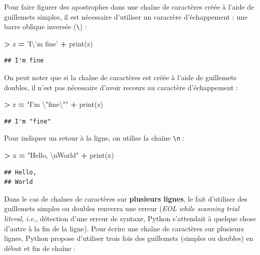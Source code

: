 \documentclass[12pt,]{book}
\newenvironment{Shaded}{\begin{snugshade}}{\end{snugshade}}
\newcommand{\CharTok}[1]{\textcolor[rgb]{0.31,0.60,0.02}{#1}}
\newcommand{\StringTok}[1]{\textcolor[rgb]{0.31,0.60,0.02}{#1}}
\newcommand{\OperatorTok}[1]{\textcolor[rgb]{0.81,0.36,0.00}{\textbf{#1}}}
\newcommand{\BuiltInTok}[1]{#1}
\newcommand{\NormalTok}[1]{#1}
\numberwithin{equation}{section}
\numberwithin{countremarque}{section}
\begin{document}
Pour faire figurer des apostrophes dans une chaîne de caractères créée à
l'aide de guillemets simples, il est nécessaire d'utiliser un caracrère
d'échappement : une barre oblique inversée (\texttt{\textbackslash{}}) :

\begin{Shaded}
\begin{Highlighting}[]
\OperatorTok{>}\NormalTok{ z }\OperatorTok{=} \StringTok{'I}\CharTok{\textbackslash{}'}\StringTok{m fine'}
\OperatorTok{+} \BuiltInTok{print}\NormalTok{(z)}
\end{Highlighting}
\end{Shaded}

\begin{lstlisting}
## I'm fine
\end{lstlisting}

On peut noter que si la chaîne de caractères est créée à l'aide de
guillemets doubles, il n'est pas nécessaire d'avoir recours au caractère
d'échappement :

\begin{Shaded}
\begin{Highlighting}[]
\OperatorTok{>}\NormalTok{ z }\OperatorTok{=} \StringTok{"I'm }\CharTok{\textbackslash{}"}\StringTok{fine}\CharTok{\textbackslash{}"}\StringTok{"}
\OperatorTok{+} \BuiltInTok{print}\NormalTok{(z)}
\end{Highlighting}
\end{Shaded}

\begin{lstlisting}
## I'm "fine"
\end{lstlisting}

Pour indiquer un retour à la ligne, on utilise la chaîne
\texttt{\textbackslash{}n} :

\begin{Shaded}
\begin{Highlighting}[]
\OperatorTok{>}\NormalTok{ x }\OperatorTok{=} \StringTok{"Hello, }\CharTok{\textbackslash{}n}\StringTok{World"}
\OperatorTok{+} \BuiltInTok{print}\NormalTok{(x)}
\end{Highlighting}
\end{Shaded}

\begin{lstlisting}
## Hello, 
## World
\end{lstlisting}

Dans le cas de chaînes de caractères sur \textbf{plusieurs lignes}, le
fait d'utiliser des guillemets simples ou doubles renverra une erreur
(\emph{EOL while scanning trial literal}, \emph{i.e.}, détection d'une
erreur de syntaxe, Python s'attendait à quelque chose d'autre à la fin
de la ligne). Pour écrire une chaîne de caractères sur plusieurs lignes,
Python propose d'utiliser trois fois des guillemets (simples ou doubles)
en début et fin de chaîne :
\end{document}
